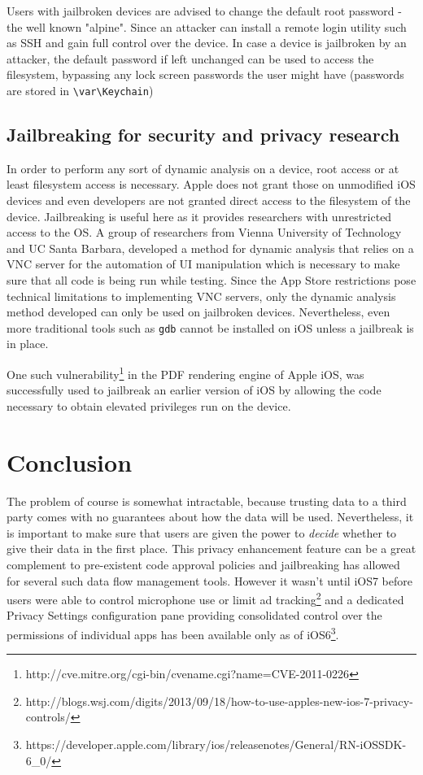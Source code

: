 \documentclass[12pt, titlepage, oneside]{article}
\begin{document}
Users with jailbroken devices are advised to change the default root password - the well known "alpine". Since an attacker can install a remote login utility such as SSH and gain full control over the device. In case a device is jailbroken by an attacker, the default password if left unchanged can be used to access the filesystem, bypassing any lock screen passwords the user might have (passwords are stored in \texttt{{\textbackslash}var{\textbackslash}Keychain})\cite{lostpass}

\subsection{Jailbreaking for security and privacy research}
In order to perform any sort of dynamic analysis on a device, root access or at least filesystem access is necessary. Apple does not grant those on unmodified iOS devices and even developers are not granted direct access to the filesystem of the device. Jailbreaking is useful here as it provides researchers with unrestricted access to the OS. 
A group of researchers from Vienna University of Technology and UC Santa Barbara\cite{dynamic}, developed a method for dynamic analysis that relies on a VNC server for the automation of UI manipulation which is necessary to make sure that all code is being run while testing. Since the App Store restrictions pose technical limitations to implementing VNC servers, only the dynamic analysis method developed can only be used on jailbroken devices. Nevertheless, even more traditional tools such as \texttt{gdb} cannot be installed on iOS unless a jailbreak is in place.



One such vulnerability\footnote{http://cve.mitre.org/cgi-bin/cvename.cgi?name=CVE-2011-0226} in the PDF rendering engine of Apple iOS\cite{pios}, was successfully used to jailbreak an earlier version of iOS by allowing the code necessary to obtain elevated privileges run on the device. 

\section{Conclusion}
The problem of course is somewhat intractable, because trusting data to a third party comes with no guarantees about how the data will be used. Nevertheless, it is important to make sure that users are given the power to \emph{decide} whether to give their data in the first place. This privacy enhancement feature can be a great complement to pre-existent code approval policies and jailbreaking has allowed for several such data flow management tools. However it wasn't until iOS7 before users were able to control microphone use or limit ad tracking\footnote{http://blogs.wsj.com/digits/2013/09/18/how-to-use-apples-new-ios-7-privacy-controls/} and a dedicated Privacy Settings configuration pane providing consolidated control over the permissions of individual apps has been available only as of iOS6\footnote{https://developer.apple.com/library/ios/releasenotes/General/RN-iOSSDK-6\_0/}. 

\pagebreak

\nocite{*} 




\end{document}
